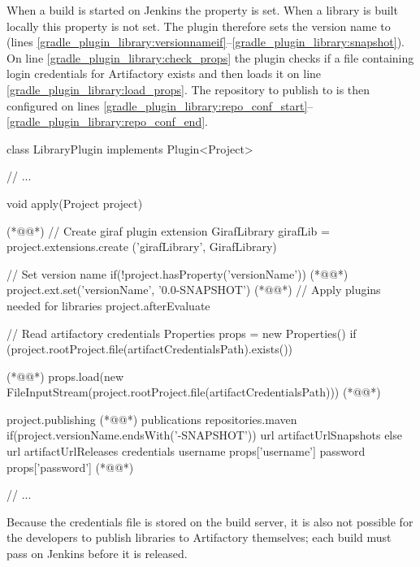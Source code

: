 When a build is started on Jenkins the property  is set. When a library is built locally this property is not set. The plugin therefore sets the version name to  (lines \ref{gradle_plugin_library:versionnameif}--\ref{gradle_plugin_library:snapshot}). On line \ref{gradle_plugin_library:check_props} the plugin checks if a file containing login credentials for Artifactory exists and then loads it on line \ref{gradle_plugin_library:load_props}. The repository to publish to is then configured on lines \ref{gradle_plugin_library:repo_conf_start}--\ref{gradle_plugin_library:repo_conf_end}.

\begin{gradlecode}[caption=Part of Gradle Plugin to publish libraries,label=lst:gradle_plugin_library]
class LibraryPlugin implements Plugin<Project> {
  // ...

  void apply(Project project) { (*@\label{gradle_plugin_library:arg}@*)
    // Create giraf plugin extension
    GirafLibrary girafLib = project.extensions.create ('girafLibrary', GirafLibrary)

    // Set version name
    if(!project.hasProperty('versionName')) { (*@\label{gradle_plugin_library:versionnameif}@*)
      project.ext.set('versionName', '0.0-SNAPSHOT') (*@\label{gradle_plugin_library:snapshot}@*)
    }
    // Apply plugins needed for libraries
    project.afterEvaluate {
      // Read artifactory credentials
      Properties props = new Properties()
      if (project.rootProject.file(artifactCredentialsPath).exists()) { (*@\label{gradle_plugin_library:check_props}@*)
        props.load(new FileInputStream(project.rootProject.file(artifactCredentialsPath))) (*@\label{gradle_plugin_library:load_props}@*)

        project.publishing { (*@\label{gradle_plugin_library:repo_conf_start}@*)
          publications {
            repositories.maven {
              if(project.versionName.endsWith('-SNAPSHOT')) {
                url artifactUrlSnapshots
              } else {
                url artifactUrlReleases
              }
              credentials {
                username props['username']
                password props['password']
              } (*@\label{gradle_plugin_library:repo_conf_end}@*)
            }
          }
        }
      }

      // ...
    }
  }
}
\end{gradlecode}

Because the credentials file is stored on the build server, it is also not possible for the developers to publish libraries to Artifactory themselves; each build must pass on Jenkins before it is released.

